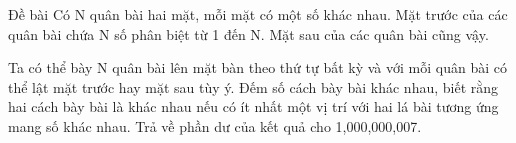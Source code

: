 Đề bài  
Có N quân bài hai mặt, mỗi mặt có một số khác nhau. Mặt trước của các quân bài chứa N số phân biệt từ 1 đến N. Mặt sau của các quân bài cũng vậy.  

   Ta có thể bày N quân bài lên mặt bàn theo thứ tự bất kỳ và với mỗi quân bài có thể lật mặt trước hay mặt sau tùy ý. Đếm số cách bày bài khác nhau, biết rằng hai cách bày bài là khác nhau nếu có ít nhất một vị trí với hai lá bài tương ứng mang số khác nhau. Trả về phần dư của kết quả cho 1,000,000,007.